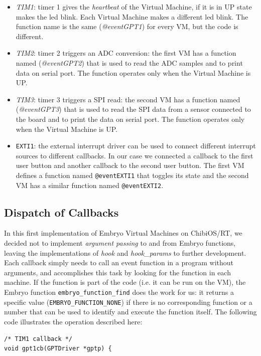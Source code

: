 \documentclass[a4paper,10pt]{article}
\begin{document}
\begin{multicols}{2}
\begin{itemize}
\item \textit{TIM1}: timer 1 gives the \textit{heartbeat} of the Virtual Machine, if it is in UP state makes the led  blink. Each Virtual Machine makes a different led blink. The function name is the same (\textit{@eventGPT1}) for every VM, but the code is different.
\item \textit{TIM2}: timer 2 triggers an ADC conversion: the first VM has a function named (\textit{@eventGPT2}) that is used to read the ADC samples and to print data on serial port. The function operates only when the Virtual Machine is UP.
\item \textit{TIM3}: timer 3 triggers a SPI read: the second VM has a function named (\textit{@eventGPT3}) that is used to read the SPI data from a sensor connected to the board and to print the data on serial port. The function operates only when the Virtual Machine is UP.
\item \texttt{EXTI1}: the external interrupt driver can be used to connect different interrupt sources to different callbacks. In our case we connected a callback to the first user button and another callback to the second user button. The first VM defines a function named \texttt{@eventEXTI1} that toggles its state and the second VM has a similar function named \texttt{@eventEXTI2}.
\end{itemize}

\subsection{Dispatch of Callbacks}
In this first implementation of Embryo Virtual Machines on ChibiOS/RT, we decided not to implement \textit{argument passing} to and from Embryo functions, leaving the implementations of \textit{hook} and \textit{hook\_params} to further development.\newline
Each callback simply needs to call an event function in a program without arguments, and accomplishes this task by looking for the function in each machine. If the function is part of the code (i.e. it can be run on the VM), the Embryo function \texttt{embryo\_function\_find} does the work for us: it returns a specific value (\texttt{EMBRYO\_FUNCTION\_NONE}) if there is no corresponding function or a number that can be used to identify and execute the function itself.\newline
The following code illustrates the operation described here:
\medskip
\lstset{language=C}
\begin{lstlisting}[caption={Callback looking for a function in VMs}]
/* TIM1 callback */
void gpt1cb(GPTDriver *gptp) {


\end{lstlisting}
\end{multicols}
\end{document}
